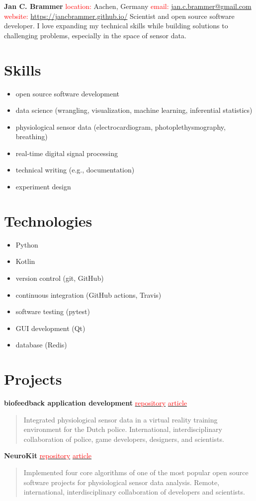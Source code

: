 \documentclass[a4paper, 10pt]{article}
\newcommand{\Head}[3]{
    \noindent \textbf{\Huge Jan C. Brammer} \bigskip \newline
    \textcolor{red}{location:} Aachen, Germany \newline
    \textcolor{red}{email:} \href{mailto:#1}{#1} \newline
    \textcolor{red}{website:} \url{#2} \bigskip \newline
    {#3}
}
\newcommand{\NewSection}[1]{\section*{\Large #1 \hrulefill}}
\newcommand{\Project}[4]{\noindent \textbf{#1} \newline
    \href{#2}{\textcolor{red}{repository}} \textbar{} \href{#3}{\textcolor{red}{article}} \newline
    \begin{quote} \vspace{-\baselineskip} #4 \vspace{\baselineskip} \end{quote}
}
\begin{document}
\Head{jan.c.brammer@gmail.com}
{https://jancbrammer.github.io/}
{Scientist and open source software developer. I love expanding my technical skills while building solutions to challenging problems, especially in the space of sensor data.}


\NewSection{Skills}
\begin{itemize}[leftmargin=*]    %
    \item open source software development
    \item data science (wrangling, visualization, machine learning, inferential statistics)
    \item physiological sensor data (electrocardiogram, photoplethysmography, breathing)
    \item real-time digital signal processing
    \item technical writing (e.g., documentation)
    \item experiment design
\end{itemize}


\NewSection{Technologies}
\begin{itemize}[leftmargin=*]
    \item Python
    \item Kotlin
    \item version control (git, GitHub)
    \item continuous integration (GitHub actions, Travis)
    \item software testing (pytest)
    \item GUI development (Qt)
    \item database (Redis)
\end{itemize}


\NewSection{Projects}
\Project{biofeedback application development}
{}
{https://github.com/JanCBrammer/JanCBrammer.github.io/raw/gh-pages/frontiers_article.pdf}
{Integrated physiological sensor data in a virtual reality training environment for the Dutch police. International, interdisciplinary collaboration of police, game developers, designers, and scientists.}

\Project{NeuroKit}
{https://github.com/neuropsychology/NeuroKit}
{https://github.com/JanCBrammer/JanCBrammer.github.io/raw/gh-pages/neurokit_article.pdf}
{Implemented four core algorithms of one of the most popular open source software projects for physiological sensor data analysis. Remote, international, interdisciplinary collaboration of developers and scientists.}
\end{document}
